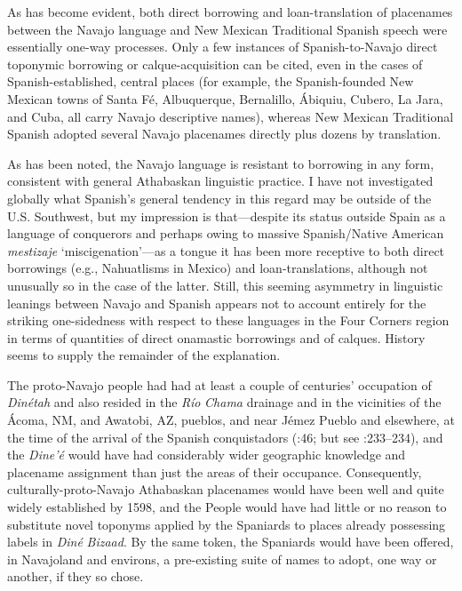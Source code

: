 As has become evident, both direct borrowing and loan-translation of placenames between the Navajo language and New Mexican Traditional Spanish speech were essentially one-way processes.  Only a few instances of Spanish-to-Navajo direct toponymic borrowing or calque-acquisition can be cited, even in the cases of Spanish-established, central places (for example, the Spanish-founded New Mexican towns of Santa Fé, Albuquerque, Bernalillo, Ábiquiu, Cubero, La Jara, and Cuba, all carry Navajo descriptive names), whereas New Mexican Traditional Spanish adopted several Navajo placenames directly plus dozens by translation.  

As has been noted, the Navajo language is resistant to borrowing in any form, consistent with general Athabaskan linguistic practice.  I have not investigated globally what Spanish’s general tendency in this regard may be outside of the U.S. Southwest, but my impression is that—despite its status outside Spain as a language of conquerors and perhaps owing to massive Spanish/Native American \textit{mestizaje} ‘miscigenation’—as a tongue it has been more receptive to both direct borrowings (e.g., Nahuatlisms in Mexico) and loan-translations, although not unusually so in the case of the latter.  Still, this seeming asymmetry in linguistic leanings between Navajo and Spanish appears not to account entirely for the striking one-sidedness with respect to these languages in the Four Corners region in terms of quantities of direct onamastic borrowings and of calques.  History seems to supply the remainder of the explanation.  

  The proto-Navajo people had had at least a couple of centuries’ occupation of \textit{Dinétah} and also resided in the \textit{Río} \textit{Chama} drainage and in the vicinities of the Ácoma, NM, and Awatobi, AZ, pueblos, and near Jémez Pueblo and elsewhere, at the time of the arrival of the Spanish conquistadors (\citealt{Brugge2006}:46; but see \citealt{Schaafsma2002}:233–234), and the \textit{Dine’é} would have had considerably wider geographic knowledge and placename assignment than just the areas of their occupance.  Consequently, culturally-proto-Navajo Athabaskan placenames would have been well and quite widely established by 1598, and the People would have had little or no reason to substitute novel toponyms applied by the Spaniards to places already possessing labels in \textit{Diné} \textit{Bizaad}.  By the same token, the Spaniards would have been offered, in Navajoland and environs, a pre-existing suite of names to adopt, one way or another, if they so chose.  

